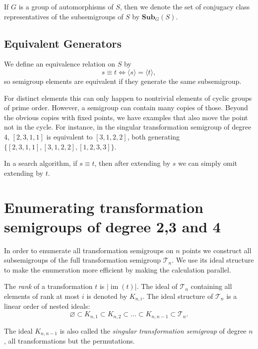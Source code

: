 \documentclass{amsart}
\newcommand{\cT}{{\mathcal T}}
\newcommand{\Sub}{\mathbf{Sub}}
\DeclareMathOperator{\im}{im}
\newcommand{\todo}[1]{\textcolor{red}{ \small \textsf{[ #1 ]} \normalsize}}
\theoremstyle{plain}
\theoremstyle{definition}
\begin{document}
If $G$ is a group of automorphisms of $S$, then we denote the set of conjugacy class representatives of the subsemigroups of $S$ by $\Sub_G(S)$. %



\subsection{Equivalent Generators}
\label{sec:equivgen}
We define an equivalence relation on $S$ by
$$ s\equiv t \Longleftrightarrow \langle s \rangle= \langle t  \rangle,$$
so semigroup elements are equivalent if they generate the same subsemigroup.

For distinct elements this can only happen to nontrivial elements of cyclic groups of prime order.
However, a semigroup can contain many copies of those.
Beyond the obvious copies with fixed points, we have examples that also move the point not in the cycle. For instance, in the singular transformation semigroup of degree 4, $[ 2, 3, 1, 1 ]$ is equivalent to  $[ 3, 1, 2, 2 ]$, both generating $\{ [ 2, 3, 1, 1 ], [ 3, 1, 2, 2 ], [ 1, 2, 3, 3 ]\}$.

In a search algorithm, if $s\equiv t$, then after extending by $s$ we can simply omit extending by $t$.

\section{Enumerating transformation semigroups of degree 2,3 and 4}
\label{sec:fulltranssgp}

In order to enumerate all transformation semigroups on $n$ points we construct
all subsemigroups of the full transformation semigroup $\cT_n$. We use its ideal
structure to make the enumeration more efficient by making the calculation parallel.

The \emph{rank} of a transformation $t$ is $|\im(t)|$. 
The ideal of $\cT_n$ containing all elements of rank at most $i$ is denoted by $K_{n,i}$.
The ideal structure of $\cT_n$ is a linear order of nested ideals: %
$$\varnothing\subset K_{n,1}\subset K_{n,2}\subset\ldots\subset K_{n,n-1}\subset \cT_n.$$

The ideal $K_{n,n-1}$ is also called the \emph{singular transformation semigroup} of degree $n$, all transformations but the permutations.
\end{document}
